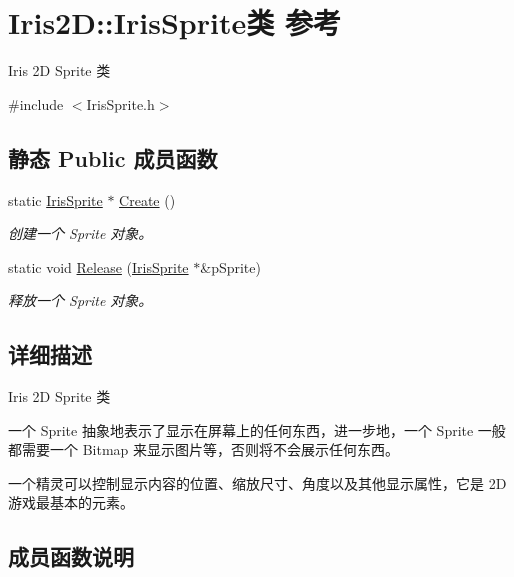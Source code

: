 \hypertarget{class_iris2_d_1_1_iris_sprite}{}\section{Iris2D\+:\+:Iris\+Sprite类 参考}
\label{class_iris2_d_1_1_iris_sprite}


Iris 2D Sprite 类  




{\ttfamily \#include $<$Iris\+Sprite.\+h$>$}

\subsection*{静态 Public 成员函数}
\begin{DoxyCompactItemize}
\item 
static \hyperlink{class_iris2_d_1_1_iris_sprite}{Iris\+Sprite} $\ast$ \hyperlink{class_iris2_d_1_1_iris_sprite_ab68ea873fcd8521324c8497455dee852}{Create} ()
\begin{DoxyCompactList}\small\item\em 创建一个 Sprite 对象。 \end{DoxyCompactList}\item 
static void \hyperlink{class_iris2_d_1_1_iris_sprite_aa225c6483e0282375187b092ea0cecf9}{Release} (\hyperlink{class_iris2_d_1_1_iris_sprite}{Iris\+Sprite} $\ast$\&p\+Sprite)
\begin{DoxyCompactList}\small\item\em 释放一个 Sprite 对象。 \end{DoxyCompactList}\end{DoxyCompactItemize}


\subsection{详细描述}
Iris 2D Sprite 类 

一个 Sprite 抽象地表示了显示在屏幕上的任何东西，进一步地，一个 Sprite 一般都需要一个 Bitmap 来显示图片等，否则将不会展示任何东西。

一个精灵可以控制显示内容的位置、缩放尺寸、角度以及其他显示属性，它是 2D 游戏最基本的元素。 

\subsection{成员函数说明}
\mbox{\label{class_iris2_d_1_1_iris_sprite_ab68ea873fcd8521324c8497455dee852}} 
